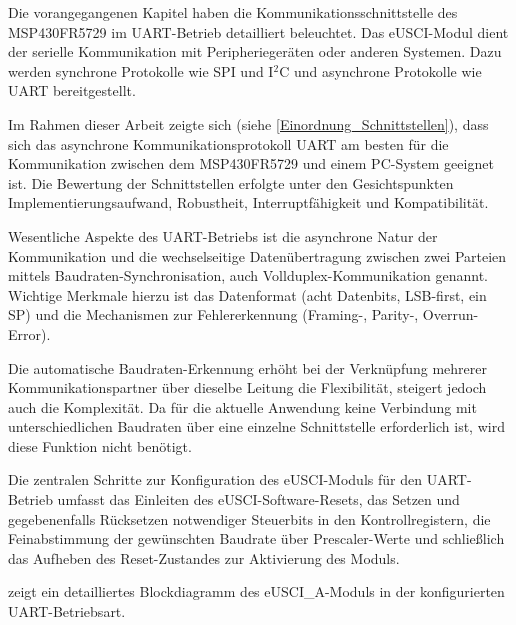Die vorangegangenen Kapitel haben die Kommunikationsschnittstelle des MSP430FR5729 im UART-Betrieb detailliert beleuchtet. Das eUSCI-Modul dient der serielle Kommunikation mit Peripherieger\"aten oder anderen Systemen. Dazu werden synchrone Protokolle wie SPI und I$^{2}$C und asynchrone Protokolle wie UART bereitgestellt.

Im Rahmen dieser Arbeit zeigte sich (siehe \ref{Einordnung_Schnittstellen}), dass sich das asynchrone Kommunikationsprotokoll UART am besten f\"ur die Kommunikation zwischen dem MSP430FR5729 und einem PC-System geeignet ist. Die Bewertung der Schnittstellen erfolgte unter den Gesichtspunkten Implementierungsaufwand, Robustheit, Interruptf\"ahigkeit und Kompatibilit\"at.

Wesentliche Aspekte des UART-Betriebs ist die asynchrone Natur der Kommunikation und die wechselseitige Daten\"ubertragung zwischen zwei Parteien mittels Baudraten-Synchronisation, auch Vollduplex-Kommunikation genannt. Wichtige Merkmale hierzu ist das Datenformat (\zB acht Datenbits, LSB-first, ein SP) und die Mechanismen zur Fehlererkennung (\zB Framing-, Parity-, Overrun-Error).

Die automatische Baudraten-Erkennung erh\"oht bei der Verkn\"upfung mehrerer Kommunikationspartner \"uber dieselbe Leitung die Flexibilit\"at, steigert jedoch auch die Komplexit\"at. Da f\"ur die aktuelle Anwendung keine Verbindung mit unterschiedlichen Baudraten \"uber eine einzelne Schnittstelle erforderlich ist, wird diese Funktion nicht ben\"otigt.

Die zentralen Schritte zur Konfiguration des eUSCI-Moduls für den UART-Betrieb umfasst das Einleiten des eUSCI-Software-Resets, das Setzen und gegebenenfalls R\"ucksetzen notwendiger Steuerbits in den Kontrollregistern, die Feinabstimmung der gew\"unschten Baudrate \"uber Prescaler-Werte und schließlich das Aufheben des Reset-Zustandes zur Aktivierung des Moduls.

 zeigt ein detailliertes Blockdiagramm des eUSCI\_A-Moduls in der konfigurierten UART-Betriebsart.

